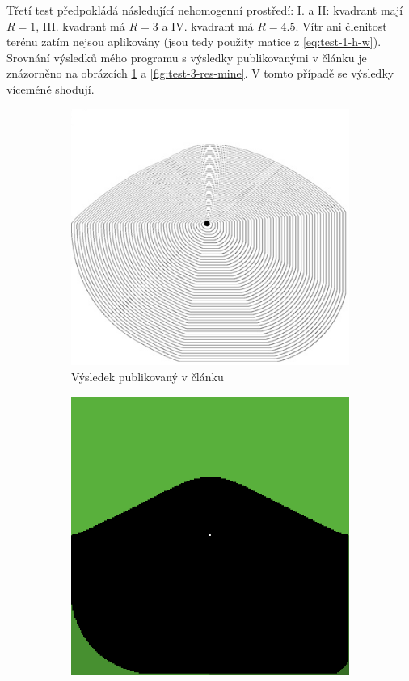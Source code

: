 \documentclass[11pt,a4paper]{scrartcl}
\begin{document}
	Třetí test předpokládá následující nehomogenní prostředí: I. a II: kvadrant mají $R=1$, III. kvadrant má $R=3$ a IV. kvadrant má $R=4.5$. Vítr ani členitost terénu zatím nejsou aplikovány (jsou tedy použity matice z \ref{eq:test-1-h-w}). Srovnání výsledků mého programu s výsledky publikovanými v článku je znázorněno na obrázcích \ref{fig:test-3-res-art} a \ref{fig:test-3-res-mine}. V tomto případě se výsledky víceméně shodují.
	
	\begin{figure}[H]
		\centering
		\begin{subfigure} {0.3 \textwidth}
			\includegraphics[width=\linewidth]{art-inhomogeneous-no-wh}
			\caption{Výsledek publikovaný v článku}
			\label{fig:test-3-res-art}
		\end{subfigure}
		\hspace*{0.1 \textwidth}
		\begin{subfigure} {0.3 \textwidth}
			\includegraphics[width=\linewidth]{inhomogeneous-no-wh}

\end{subfigure}
\end{figure}
\end{document}
